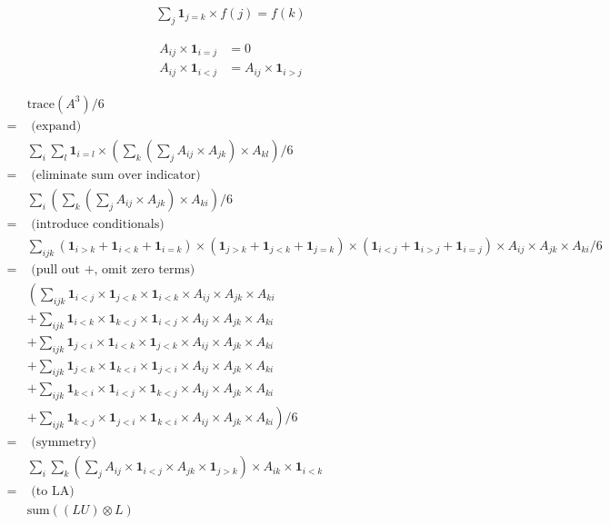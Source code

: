 \documentclass{article}
\newcommand{\I}{\mathbf{1}}
\begin{document}
\begin{align*}
\sum_{j} \I_{j=k} \times f(j) = f(k)
\end{align*}

\begin{align*}
A_{ij} \times \I_{i=j} & = 0 \\
A_{ij} \times \I_{i<j} & = A_{ij} \times \I_{i>j}
\end{align*}

\begin{align*}
  & \text{trace}(A^3) / 6 \\
= & \text{ (expand)} \\
  & \sum_i \sum_l \I_{i=l} \times \left( \sum_k \left(\sum_j A_{ij} \times A_{jk} \right) \times A_{kl} \right) / 6 \\
= & \text{ (eliminate sum over indicator)} \\
  &  \sum_i \left( \sum_k \left(\sum_j A_{ij} \times A_{jk} \right) \times A_{ki} \right) / 6 \\
= & \text{ (introduce conditionals)}  \\
  & \sum_{ijk} (\I_{i>k} + \I_{i<k} + \I_{i=k})\times (\I_{j>k} + \I_{j<k} + \I_{j=k}) \times (\I_{i<j} + \I_{i>j} + \I_{i=j}) \times A_{ij} \times A_{jk} \times  A_{ki} / 6 \\
= & \text{ (pull out +, omit zero terms) } \\
  & \left( \sum_{ijk} \I_{i<j} \times \I_{j<k} \times \I_{i<k} \times A_{ij} \times A_{jk} \times A_{ki} \right. \\
& + \sum_{ijk} \I_{i<k} \times \I_{k<j} \times \I_{i<j} \times A_{ij} \times A_{jk} \times A_{ki} \\
&+  \sum_{ijk} \I_{j<i} \times \I_{i<k} \times \I_{j<k} \times A_{ij} \times A_{jk} \times A_{ki} \\
&+  \sum_{ijk} \I_{j<k} \times \I_{k<i} \times \I_{j<i} \times A_{ij} \times A_{jk} \times A_{ki} \\
&+  \sum_{ijk} \I_{k<i} \times \I_{i<j} \times \I_{k<j} \times A_{ij} \times A_{jk} \times A_{ki} \\
&+  \left. \sum_{ijk} \I_{k<j} \times \I_{j<i} \times \I_{k<i} \times A_{ij} \times A_{jk} \times A_{ki} \right) / 6 \\
= & \text{ (symmetry)} \\
  & \sum_i \sum_k \left(\sum_j A_{ij} \times \I_{i<j} \times A_{jk} \times \I_{j>k}\right) \times A_{ik} \times \I_{i<k} \\
= & \text{ (to LA)} \\
  & \text{sum} ((LU) \otimes L)
\end{align*}

\end{document}
